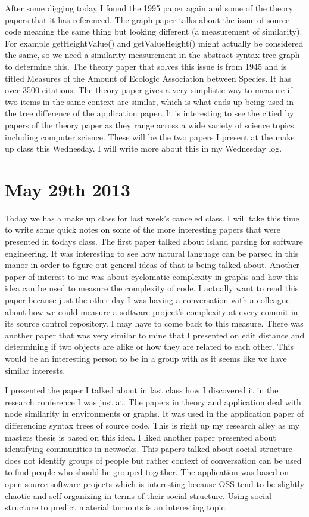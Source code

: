 \documentclass[conference]{IEEEtran}
\begin{document}
After some digging today I found the 1995 paper again and some of the theory
papers that it has referenced. The graph paper talks about the issue of
source code meaning the same thing but looking different (a measurement 
of similarity). For example getHeightValue() and getValueHeight() might 
actually be considered the same, so we need a similarity measurement in the
abstract syntax tree graph to determine this. The theory paper that solves
this issue is from 1945 and is titled Measures of the Amount of Ecologic
Association between Species. It has over 3500 citations. The theory paper
gives a very simplistic way to measure if two items in the same context
are similar, which is what ends up being used in the tree difference of
the application paper. It is interesting to see the citied by papers of
the theory paper as they range across a wide variety of science topics
including computer science. These will be the two papers I present at 
the make up class this Wednesday. I will write more about this in my
Wednesday log.

\section{May 29th 2013}
Today we has a make up class for last week's canceled class. I will take
this time to write some quick notes on some of the more interesting papers
that were presented in todays class. The first paper talked about island 
parsing for software engineering. It was interesting to see how natural 
language can be parsed in this manor in order to figure out general ideas
of that is being talked about. Another paper of interest to me was about
cyclomatic complexity in graphs and how this idea can be used to measure the 
complexity of code. I actually want to read this paper because just the other
day I was having a conversation with a colleague about how we could measure 
a software project's complexity at every commit in its source control repository.
I may have to come back to this measure. There was another paper that was very
similar to mine that I presented on edit distance and determining if two
objects are alike or how they are related to each other. This would be an
interesting person to be in a group with as it seems like we have similar
interests. 

I presented the paper I talked about in last class how I discovered it in
the research conference I was just at. The papers in theory and application
deal with node similarity in environments or graphs. It was used in the
application paper of differencing syntax trees of source code. This is right up
my research alley as my masters thesis is based on this idea. I liked another
paper presented about identifying communities in networks. This papers talked
about social structure does not identify groups of people but rather context
of conversation can be used to find people who should be grouped together.
The application was based on open source software projects which is interesting
because OSS tend to be slightly chaotic and self organizing in terms of their
social structure. Using social structure to predict material turnouts is an
interesting topic.
\end{document}
